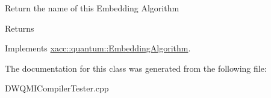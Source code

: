 Return the name of this Embedding Algorithm \begin{DoxyReturn}{Returns}

\end{DoxyReturn}


Implements \hyperlink{a01189_a21079dc8ee37792977f5fd209e3f3b19}{xacc\+::quantum\+::\+Embedding\+Algorithm}.



The documentation for this class was generated from the following file\+:\begin{DoxyCompactItemize}
\item 
D\+W\+Q\+M\+I\+Compiler\+Tester.\+cpp\end{DoxyCompactItemize}
